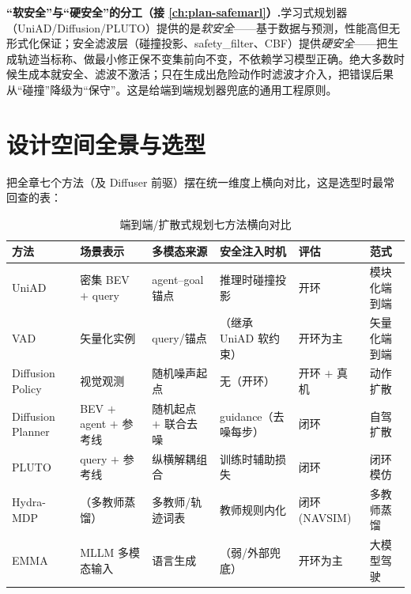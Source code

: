 \begin{note}
\textbf{“软安全”与“硬安全”的分工（接 \cref{ch:plan-safemarl}）.}\;学习式规划器（UniAD/Diffusion/PLUTO）提供的是\emph{软安全}——基于数据与预测，性能高但无形式化保证；安全滤波层（碰撞投影、safety\_filter、CBF）提供\emph{硬安全}——把生成轨迹当标称、做最小修正保不变集前向不变，不依赖学习模型正确。绝大多数时候生成本就安全、滤波不激活；只在生成出危险动作时滤波才介入，把错误后果从“碰撞”降级为“保守”。这是给端到端规划器兜底的通用工程原则。
\end{note}

\section{设计空间全景与选型}
\label{sec:de-design}

把全章七个方法（及 Diffuser 前驱）摆在统一维度上横向对比，这是选型时最常回查的表：

\begin{table}[H]\centering\small
\caption{端到端/扩散式规划七方法横向对比}
\label{tab:de-seven}
\begin{tabular}{p{} p{} p{} p{} p{} p{}}
\toprule
方法 & 场景表示 & 多模态来源 & 安全注入时机 & 评估 & 范式 \\
\midrule
UniAD & 密集 BEV $+$ query & agent--goal 锚点 & 推理时碰撞投影 & 开环 & 模块化端到端 \\
VAD & 矢量化实例 & query/锚点 & （继承 UniAD 软约束） & 开环为主 & 矢量化端到端 \\
Diffusion Policy & 视觉观测 & 随机噪声起点 & 无（开环） & 开环 $+$ 真机 & 动作扩散 \\
Diffusion Planner & BEV $+$ agent $+$ 参考线 & 随机起点 $+$ 联合去噪 & guidance（去噪每步） & 闭环 & 自驾扩散 \\
PLUTO & query $+$ 参考线 & 纵横解耦组合 & 训练时辅助损失 & 闭环 & 闭环模仿 \\
Hydra-MDP & （多教师蒸馏） & 多教师/轨迹词表 & 教师规则内化 & 闭环(NAVSIM) & 多教师蒸馏 \\
EMMA & MLLM 多模态输入 & 语言生成 & （弱/外部兜底） & 开环为主 & 大模型驾驶 \\
\bottomrule
\end{tabular}
\end{table}

